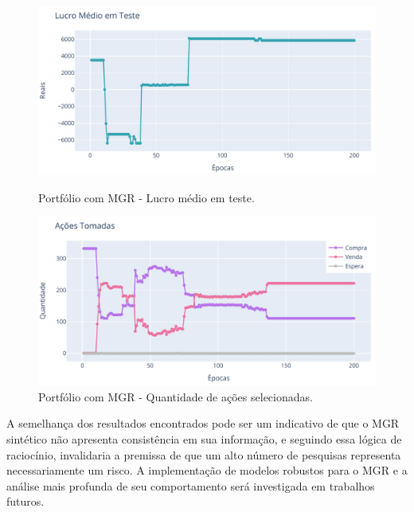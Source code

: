 \begin{figure}[htbp]
    \centering 
    \begin{minipage}[b]{0.45\linewidth}
        \includegraphics[width=\linewidth]{img/ddpg/all/risk/profit_test.pdf}
        \caption{Portfólio com \acrshort{MGR} - Lucro médio em teste.} 
        \label{all_risk_profit}
    \end{minipage}
    \quad
    \begin{minipage}[b]{0.45\linewidth}
        \includegraphics[width=\linewidth]{img/ddpg/all/risk/actions.pdf}
        \caption{Portfólio com \acrshort{MGR} - Quantidade de ações selecionadas.}
        \label{all_risk_act}
    \end{minipage}
\end{figure}

A semelhança dos resultados encontrados pode ser um indicativo de que o \acrshort{MGR} sintético não apresenta consistência em sua informação, e seguindo essa lógica de raciocínio, invalidaria a premissa de que um alto número de pesquisas representa necessariamente um risco. A implementação de modelos robustos para o \acrshort{MGR} e a análise mais profunda de seu comportamento será investigada em trabalhos futuros.
